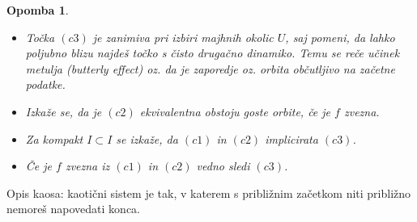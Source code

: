 \documentclass{article}
\newtheorem{opomba}{Opomba}
\begin{document}
\begin{opomba}
\hfill 
\begin{itemize}
\item Točka $(c3)$ je zanimiva pri izbiri majhnih okolic $U$, saj pomeni, da lahko poljubno blizu najdeš točko s čisto drugačno dinamiko. Temu se reče učinek metulja (butterly effect) oz. da je zaporedje oz. orbita občutljivo na začetne podatke.
\item Izkaže se, da je $(c2)$ ekvivalentna obstoju goste orbite, če je $f$ zvezna.
\item Za kompakt $I \subset I$ se izkaže, da $(c1)$ in $(c2)$ implicirata $(c3)$.
\item Če je $f$ zvezna iz $(c1)$ in $(c2)$ vedno sledi $(c3)$.
\end{itemize}
\end{opomba}
Opis kaosa: kaotični sistem je tak, v katerem s približnim začetkom niti približno nemoreš napovedati konca.
\end{document}
